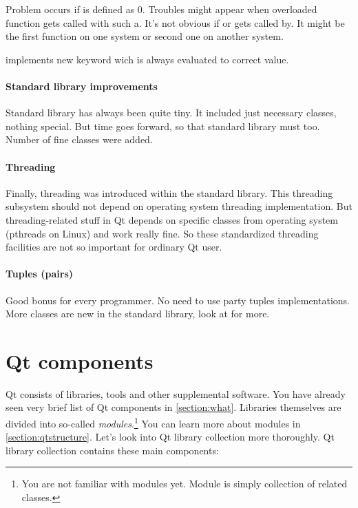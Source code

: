 Problem occurs if is defined as $0$. Troubles might appear when overloaded function gets called with such a. It's not obvious if or gets called by. It might be the first function on one system or second one on another system.

 implements new keyword wich is always evaluated to correct value.

\paragraph{Standard library improvements}
Standard library has always been quite tiny. It included just necessary classes, nothing special. But time goes forward, so that standard library must too. Number of fine classes were added.

\paragraph*{Threading}
Finally, threading was introduced within the standard library. This threading subsystem should not depend on operating system threading implementation. But threading-related stuff in Qt depends on specific classes from operating system (pthreads on Linux) and work really fine. So these standardized threading facilities are not so important for ordinary Qt user.

\paragraph*{Tuples (pairs)}
Good bonus for every \cpp programmer. No need to use  party tuples implementations. More classes are new in the standard library, look at \citep{various:cppstandard} for more.

\section{Qt components}\label{section:components}
Qt consists of libraries, tools and other supplemental software. You have already seen very brief list of Qt components in \autoref{section:what}. Libraries themselves are divided into so-called \textit{modules}.\footnote{You are not familiar with modules yet. Module is simply collection of related classes.} You can learn more about modules in \autoref{section:qtstructure}. Let's look into Qt library collection more thoroughly. Qt library collection contains these main components:


